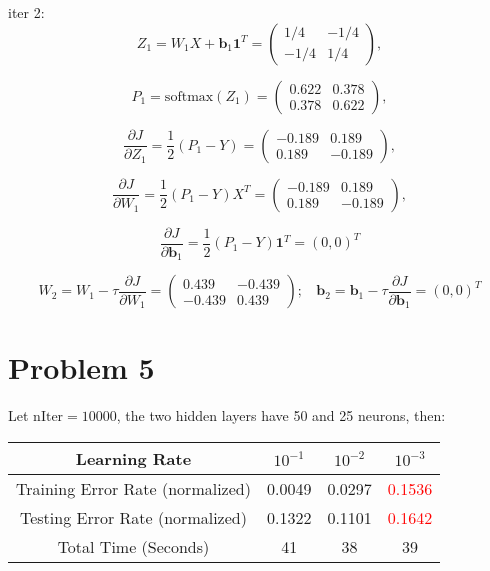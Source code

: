 \documentclass[12pt]{article}
\begin{document}
iter 2:
$$Z_1 = W_1 X  + \pmb{b}_1 \pmb{1}^T = \left(                        
\begin{matrix}
1/4 & -1/4 \\
-1/4 & 1/4
\end{matrix}
\right), 
$$

$$
P_1 = \mathrm{softmax}(Z_1) = \left(                        
\begin{matrix}
0.622 & 0.378 \\
0.378 & 0.622
\end{matrix}
\right), 
$$

$$
\frac{\partial J}{\partial Z_1} = \frac{1}{2} (P_1 - Y) =  \left(                        
\begin{matrix}
-0.189 & 0.189 \\
0.189 & -0.189
\end{matrix}
\right), 
$$

$$
\frac{\partial J}{\partial W_1} = \frac{1}{2} (P_1 - Y) X^T = \left(                        
\begin{matrix}
-0.189 & 0.189 \\
0.189 & -0.189
\end{matrix}
\right), 
$$

$$
\frac{\partial J}{\partial \pmb{b}_1} =  \frac{1}{2} (P_1 - Y) \pmb{1}^T = (0,0)^T
$$

$$
W_2 = W_1 - \tau \frac{\partial J}{\partial W_1} = \left(                        
\begin{matrix}
0.439 & -0.439 \\
-0.439 & 0.439
\end{matrix}
\right); \  \ \ \
\pmb{b}_2 = \pmb{b}_1 - \tau \frac{\partial J}{\partial \pmb{b}_1} =  (0,0)^T
$$




\section*{Problem 5}

Let $\mathrm{nIter} = 10000$, the two hidden layers have 50 and 25 neurons, then:
\begin{table}[h]
\begin{tabular}{ |c|ccc| } 
\hline
Learning Rate & $10^{-1}$ & $10^{-2}$  & $10^{-3}$   \\
 \hline
 Training Error Rate (normalized) &  0.0049 &  0.0297 & \textcolor{red}{0.1536}  \\ 
 Testing Error Rate (normalized) & 0.1322  & 0.1101  & \textcolor{red}{0.1642}   \\ 
 Total Time (Seconds) & 41 & 38 & 39 \\
 \hline
\end{tabular}
\end{table}
\end{document}
